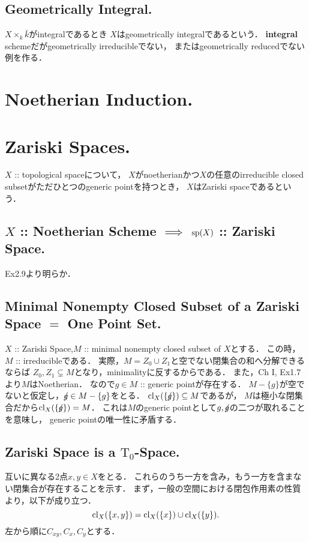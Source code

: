 \documentclass[a4paper]{jsarticle}
\begin{document}
    \subsection{Geometrically Integral.}
    $X \times_k \bar{k}$がintegralであるとき
    $X$はgeometrically integralであるという．
    \textbf{integral} schemeだがgeometrically irreducibleでない，
    またはgeometrically reducedでない例を作る．

\section{Noetherian Induction.} %

\section{Zariski Spaces.} %
    $X$ :: topological spaceについて，
    $X$がnoetherianかつ$X$の任意のirreducible closed subsetがただひとつのgeneric pointを持つとき，
    $X$はZariski spaceであるという．

    \subsection{$X$ :: Noetherian Scheme $\implies$ $\operatorname{sp}(X)$ :: Zariski Space.}
    Ex2.9より明らか．

    \subsection{Minimal Nonempty Closed Subset of a Zariski Space $=$ One Point Set.}
    $X$ :: Zariski Space,$M$ :: minimal nonempty closed subset of $X$とする．
    この時，$M$ :: irreducibleである．
    実際，$M=Z_0 \cup Z_1$と空でない閉集合の和へ分解できるならば
    $Z_0,Z_1 \subsetneq M$となり，minimalityに反するからである．
    また，Ch I, Ex1.7より$M$はNoetherian．
    なので$g \in M$ :: generic pointが存在する．
    $M-\{g\}$が空でないと仮定し，$/\hspace{-1.2ex} g \in M-\{g\}$をとる．
    $\operatorname{cl}_X(\{/\hspace{-1.2ex} g\}) \subseteq M$であるが，
    $M$は極小な閉集合だから$\operatorname{cl}_X(\{/\hspace{-1.2ex} g\})=M$．
    これは$M$のgeneric pointとして$g, /\hspace{-1.2ex} g$の二つが取れることを意味し，
    generic pointの唯一性に矛盾する．

    \subsection{Zariski Space is a $\mathrm{T_0}$-Space.}
    互いに異なる2点$x,y \in X$をとる．
    これらのうち一方を含み，もう一方を含まない閉集合が存在することを示す．
    まず，一般の空間における閉包作用素の性質より，以下が成り立つ．
    \[ \operatorname{cl}_X(\{x,y\})=\operatorname{cl}_X(\{x\}) \cup \operatorname{cl}_X(\{y\}). \]
    左から順に$C_{xy}, C_x, C_y$とする．
\end{document}
